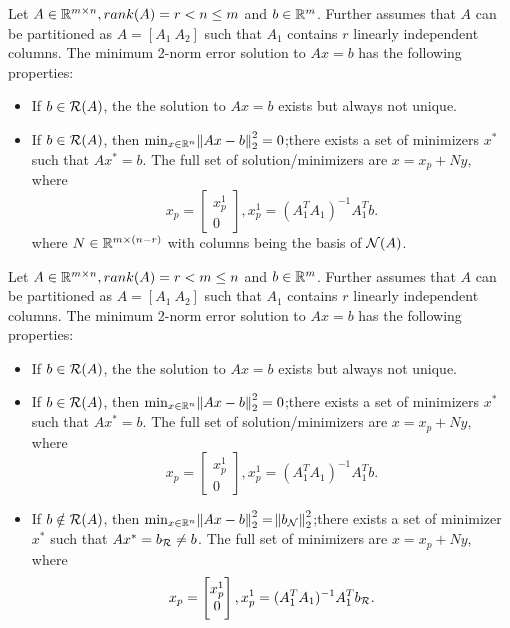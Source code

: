 \begin{refsection}
\begin{corollary}
	Let $A\in \mathbb{R}^{m\times n},rank(A) = r < n \leq m$ and $b\in \mathbb{R}^m$. Further assumes that $A$ can be partitioned as $A = [A_1 ~ A_2]$ such that $A_1$ contains $r$ linearly independent columns. The minimum 2-norm error solution to $Ax = b$ has the following properties:
\begin{itemize}
	\item If $b\in \mathcal{R}(A)$, the the solution to $Ax = b$ exists but always not unique.
	\item If $b\in \mathcal{R}(A)$, then $\min_{x\in\mathbb{R}^n} \norm{Ax - b}_2^2 = 0$;there exists a set of minimizers $x^*$ such that $Ax^* = b$. The full set of solution/minimizers are $x = x_p + Ny,$ where $$x_p = \begin{bmatrix}
	x_p^1 \\ 0
	\end{bmatrix},x_p^1 = (A_1^TA_1)^{-1}A_1^Tb.$$ 
	where $N\in \mathbb{R}^{m\times (n-r)}$ with columns being the basis of $\mathcal{N}(A)$.
\end{itemize}
\end{corollary}



\begin{corollary}
	Let $A\in \mathbb{R}^{m\times n},rank(A) =r < m\leq n$ and $b\in \mathbb{R}^m$. Further assumes that $A$ can be partitioned as $A = [A_1 ~ A_2]$ such that $A_1$ contains $r$ linearly independent columns. The minimum 2-norm error solution to $Ax = b$ has the following properties:
	\begin{itemize}
		\item If $b\in \mathcal{R}(A)$, the the solution to $Ax = b$ exists but always not unique.
		\item If $b\in \mathcal{R}(A)$, then $\min_{x\in\mathbb{R}^n} \norm{Ax - b}_2^2 = 0$;there exists a set of minimizers $x^*$ such that $Ax^* = b$. The full set of solution/minimizers are $x = x_p + Ny,$ where $$x_p = \begin{bmatrix}
		x_p^1 \\ 0
		\end{bmatrix},x_p^1 = (A_1^TA_1)^{-1}A_1^Tb.$$  

		\item If $b\notin \mathcal{R}(A)$, then $\min_{x\in\mathbb{R}^n} \norm{Ax - b}_2^2 = \norm{b_{\mathcal{N}}}_2^2$;there exists a set of minimizer $x^*$ such that $Ax^* = b_{\mathcal{R}} \neq b$. The full set of minimizers are $x = x_p + Ny,$ where $$x_p = \begin{bmatrix}
		x_p^1 \\ 0
		\end{bmatrix},x_p^1 = (A_1^TA_1)^{-1}A_1^Tb_{\mathcal{R}}.$$  
	\end{itemize}
\end{corollary}


\end{refsection}
